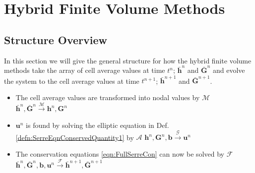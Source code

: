 
\chapter{Hybrid Finite Volume Methods}
\label{chp:HFVMMethod}







\section{Structure Overview}



In this section we will give the general structure for how the hybrid finite volume methods take the array of cell average values at time $t^n$; $\bar{\boldsymbol{h}}^n$ and $\bar{\boldsymbol{G}}^n$ and evolve the system to the cell average values at time $t^{n+1}$; $\bar{\boldsymbol{h}}^{n+ 1}$ and $\bar{\boldsymbol{G}}^{n+ 1}$.

\begin{itemize}
	\item The cell average values are transformed into nodal values by $\mathcal{M}$
		\newline  \centering $\bar{\boldsymbol{h}}^n, \bar{\boldsymbol{G}}^n  \xrightarrow{\mathcal{M}}  \boldsymbol{h}^n, \boldsymbol{G}^n  $ 
    \item $\boldsymbol{u}^n$ is found by solving the elliptic equation in Def. \ref{defn:SerreEqnConservedQuantity1} by $\mathcal{A}$
   		\newline   \centering ${\boldsymbol{h}}^n, {\boldsymbol{G}}^n , {\boldsymbol{b}}  \xrightarrow{\mathcal{\mathcal{G}}}  \boldsymbol{u}^n  $
	\item The conservation equations \eqref{eqn:FullSerreCon} can now be solved by $\mathcal{F}$ 
		\newline   \centering $\bar{\boldsymbol{h}}^n, \bar{\boldsymbol{G}}^n, {\boldsymbol{b}}, {\boldsymbol{u}}^n  \xrightarrow{\mathcal{\mathcal{F}}}  \bar{\boldsymbol{h}}^{n+ 1}, \bar{\boldsymbol{G}}^{n+ 1}  $
\end{itemize}

